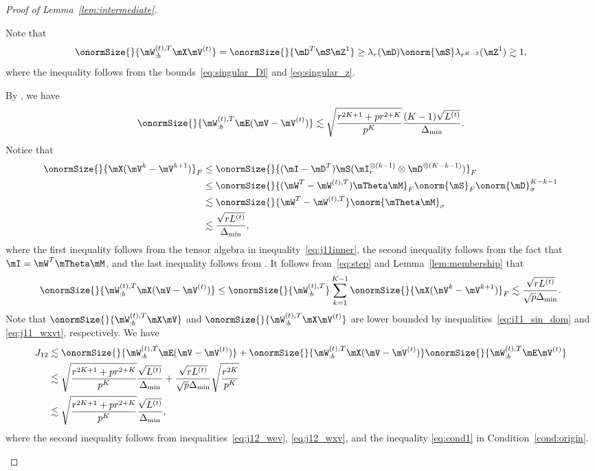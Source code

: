 \documentclass[lettersize,onecolumn,journal]{IEEEtran}
\theoremstyle{definition}
\theoremstyle{definition}
\begin{document}
\begin{proof}[Proof of Lemma~\ref{lem:intermediate}]
\begin{enumerate}[wide]
     Note that 
    \begin{equation}\label{eq:j11_wxvt}
       \onormSize{}{\mW_{:b}^{(t),T} \mX \mV^{(t)}} = \onormSize{}{\mD^T \mS \mZ^1} \geq \lambda_r(\mD) \onorm{\mS} \lambda_{r^{K-2}}(\mZ^1) \gtrsim 1,
    \end{equation}
    where the inequality follows from the bounds~\eqref{eq:singular_Dl} and \eqref{eq:singular_z}.
    
    By \citet[Proof of Lemma 5]{han2020exact}, we have 
    \begin{equation}\label{eq:j12_wev}
        \onormSize{}{\mW_{:b}^{(t),T} \mE (\mV-\mV^{(t)})} \lesssim \sqrt{ \frac{r^{2K+1} + p r^{2 + K}}{p^K} } \frac{(K-1)\sqrt{L^{(t)}}}{\Delta_{\min}}.
    \end{equation}
    Notice that 
    \begin{align}\label{eq:step}
        \onormSize{}{\mX (\mV^k-\mV^{k+1})}_F &\leq \onormSize{}{(\mI - \mD^T) \mS (\mI_r^{\otimes (k-1)} \otimes  \mD^{\otimes (K-k-1)})}_F\notag \\
        &\leq \onormSize{}{(\mW^T - \mW^{(t),T}) \mTheta \mM}_F \onorm{\mS}_F \onorm{ \mD}_{\sigma}^{K-k-1}\notag \\
        & \lesssim \onormSize{}{ \mW^T - \mW^{(t),T} } \onorm{\mTheta \mM}_{\sigma} \notag\\
        & \lesssim \frac{ \sqrt{r L^{(t)}}}{\Delta_{\min}},
    \end{align}
    where the first inequality follows from the tensor algebra in 
    inequality~\eqref{eq:j11inner}, the second inequality follows from the fact  that $\mI = \mW^T \mTheta \mM$, and the last inequality follows from \citet[Proof of Lemma 5]{han2020exact}. It follows from~\eqref{eq:step} and Lemma~\ref{lem:membership} that
    \begin{equation}
           \onormSize{}{\mW_{:b}^{(t),T} \mX (\mV-\mV^{(t)})}\leq \onormSize{}{\mW_{:b}^{(t),T} }  \sum_{k = 1}^{K-1} \onormSize{}{\mX (\mV^k-\mV^{k+1})}_F \lesssim \frac{ \sqrt{r L^{(t)}}}{\sqrt{p} \Delta_{\min}}.\label{eq:j12_wxv}
    \end{equation}
    Note that $\onormSize{}{\mW_{:b}^{(t),T} \mX \mV }$ and $\onormSize{}{\mW_{:b}^{(t),T} \mX \mV^{(t)} }$ are lower bounded by inequalities~\eqref{eq:i11_sin_dom} and \eqref{eq:j11_wxvt}, respectively. We have 
    \begin{align}
        J_{12} &\lesssim \onormSize{}{\mW_{:b}^{(t),T} \mE (\mV-\mV^{(t)})} + \onormSize{}{\mW_{:b}^{(t),T} \mX (\mV-\mV^{(t)})}\onormSize{}{\mW_{:b}^{(t),T} \mE \mV^{(t)} }\\
        &\lesssim \sqrt{ \frac{r^{2K+1} + p r^{2 + K}}{p^K} } \frac{\sqrt{L^{(t)}}}{\Delta_{\min}} + \frac{ \sqrt{r L^{(t)}}}{\sqrt{p} \Delta_{\min}} \sqrt{\frac{r^{2K}}{p^K}} \\
        & \lesssim  \sqrt{ \frac{r^{2K+1} + p r^{2 + K}}{p^K} } \frac{\sqrt{L^{(t)}}}{\Delta_{\min}},
    \end{align}
    where the second inequality follows from inequalities~\eqref{eq:j12_wev}, \eqref{eq:j12_wxv}, and the inequality \eqref{eq:cond1} in Condition~\ref{cond:origin}.
    

\end{enumerate}
\end{proof}
\end{document}
